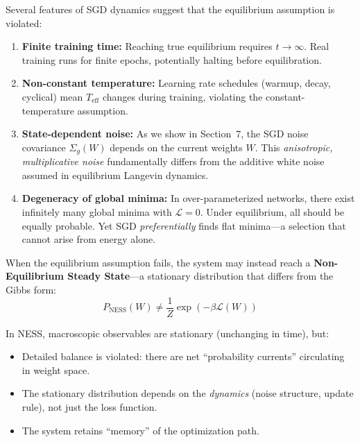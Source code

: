 \documentclass[
  journal=largetwo,
  simfonts=false,
  year=2025,
  volume=37,
]{cup-journal}
\begin{document}
\begin{remark}\label{rmk:non_equilibrium}
Several features of SGD dynamics suggest that the equilibrium assumption is violated:

\begin{enumerate}
    \item \textbf{Finite training time:} Reaching true equilibrium requires $t \to \infty$. Real training runs for finite epochs, potentially halting before equilibration.
    
    \item \textbf{Non-constant temperature:} Learning rate schedules (warmup, decay, cyclical) mean $T_{\text{eff}}$ changes during training, violating the constant-temperature assumption.
    
    \item \textbf{State-dependent noise:} As we show in Section~7, the SGD noise covariance $\Sigma_g(W)$ depends on the current weights $W$. This \textit{anisotropic, multiplicative noise} fundamentally differs from the additive white noise assumed in equilibrium Langevin dynamics.
    
    \item \textbf{Degeneracy of global minima:} In over-parameterized networks, there exist infinitely many global minima with $\mathcal{L} = 0$. Under equilibrium, all should be equally probable. Yet SGD \textit{preferentially} finds flat minima---a selection that cannot arise from energy alone.
\end{enumerate}
\end{remark}

\begin{definition}\label{def:ness}
When the equilibrium assumption fails, the system may instead reach a \textbf{Non-Equilibrium Steady State}---a stationary distribution that differs from the Gibbs form:
\begin{equation}
    P_{\text{NESS}}(W) \neq \frac{1}{Z} \exp(-\beta \mathcal{L}(W))
\end{equation}

In NESS, macroscopic observables are stationary (unchanging in time), but:
\begin{itemize}
    \item Detailed balance is violated: there are net ``probability currents'' circulating in weight space.
    \item The stationary distribution depends on the \textit{dynamics} (noise structure, update rule), not just the loss function.
    \item The system retains ``memory'' of the optimization path.
\end{itemize}
\end{definition}
\end{document}
